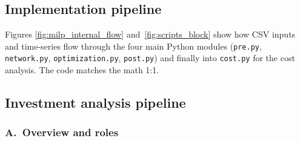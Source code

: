 \subsection{Implementation pipeline}
Figures \ref{fig:milp_internal_flow} and~\ref{fig:scripts_block}
show how CSV inputs and time-series flow through the four main Python
modules (\texttt{pre.py}, \texttt{network.py}, \texttt{optimization.py},
\texttt{post.py}) and finally into \texttt{cost.py} for the cost analysis. The code matches the
math 1:1.

\subsection{Investment analysis pipeline}
\label{ssec:milp_impl}

\subsubsection*{A.\ Overview and roles}

